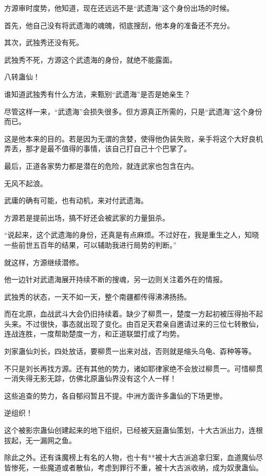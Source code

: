
\begin{this_body}

方源审时度势，他知道，现在还远远不是“武遗海”这个身份出场的时候。

首先，他自己没有将武遗海的魂魄，彻底搜刮，他本身的准备还不充分。

其次，武独秀还没有死。

武独秀不死，方源这个武遗海的身份，就绝不能露面。

八转蛊仙！

谁知道武独秀有什么方法，来甄别“武遗海”是否是她亲生？

尽管这样一来，“武遗海”会损失很多。但方源真正所需的，只是“武遗海”这个身份而已。

这是他本来的目的。若是因为无谓的贪婪，使得他伪装失败，亲手将这个大好良机弄丢，那才是最不值得的事情，该自己打自己十个巴掌了。

最后，正道各家势力都是潜在的危险，就连武家也包含在内。

无风不起浪。

武庸的确有可能，也有动机，来对付武遗海。

方源若是提前出场，搞不好还会被武家的力量狙杀。

“说起来，这个武遗海的身份，还真是有点麻烦。不过好在，我是重生之人，知晓一些前世五百年的结果，可以辅助我进行局势的判断。”

就这样，方源继续潜修。

他一边针对武遗海展开持续不断的搜魂，另一边则关注着外在的情报。

武独秀的状态，一天不如一天，整个南疆都传得沸沸扬扬。

而在北原，血战武斗大会仍旧持续着。缺少了柳贯一，楚度一方起初被压得抬不起头来。不过很快，事态就出现了变化。由百足天君亲自邀请过来的三位七转散仙，连战连胜，一度帮助楚度一方，和正道联盟打成了均势。

刘家蛊仙刘长，四处放话，要柳贯一出来对战，否则就是缩头乌龟、孬种等等。

不只是刘长再找方源。还有其他的势力，诸如耶律家绝不会放过柳贯一。可惜柳贯一消失得无影无踪，仿佛北原蛊仙界没有这个人一样！

这些追查的势力，各自郁闷暂且不提。中洲方面许多蛊仙的下场更惨。

逆组织！

这个被影宗蛊仙创建起来的地下组织，已经被天庭蛊仙策划，十大古派出力，连根拔起，无一漏网之鱼。

除此之外。还有诛魔榜上有名的人物，也十有**被十大古派追拿归案，血道魔仙尽皆惨死，一些魔道或者散仙，考虑到罪行不重，被十大古派收纳，成为奴隶蛊仙。


\end{this_body}
